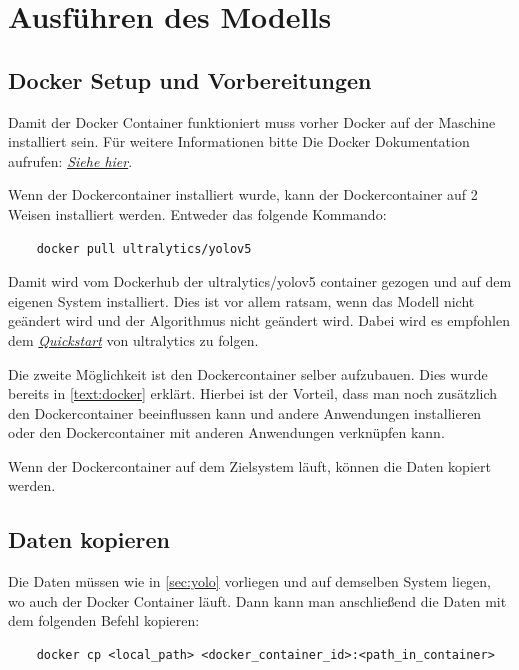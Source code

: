 \chapter{Ausführen des Modells}
\section{Docker Setup und Vorbereitungen}
Damit der Docker Container funktioniert muss vorher Docker auf der Maschine installiert sein. Für weitere Informationen bitte Die Docker Dokumentation aufrufen: \textit{\href{https://www.docker.com/get-started/}{Siehe hier}}.

Wenn der Dockercontainer installiert wurde, kann der Dockercontainer auf 2 Weisen installiert werden. Entweder das folgende Kommando:

\begin{verbatim}
    docker pull ultralytics/yolov5
\end{verbatim}

Damit wird vom Dockerhub der ultralytics/yolov5 container gezogen und auf dem eigenen System installiert. Dies ist vor allem ratsam, wenn das Modell nicht geändert wird und der Algorithmus nicht geändert wird. Dabei wird es empfohlen dem \textit{\href{https://github.com/ultralytics/yolov5/wiki/Docker-Quickstart}{Quickstart}} von ultralytics zu folgen.

Die zweite Möglichkeit ist den Dockercontainer selber aufzubauen. Dies wurde bereits in \autoref{text:docker} erklärt. Hierbei ist der Vorteil, dass man noch zusätzlich den Dockercontainer beeinflussen kann und andere Anwendungen installieren oder den Dockercontainer mit anderen Anwendungen verknüpfen kann.

Wenn der Dockercontainer auf dem Zielsystem läuft, können die Daten kopiert werden.

\section{Daten kopieren}

Die Daten müssen wie in \autoref{sec:yolo} vorliegen und auf demselben System liegen, wo auch der Docker Container läuft. Dann kann man anschließend die Daten mit dem folgenden Befehl kopieren:

\begin{verbatim}
    docker cp <local_path> <docker_container_id>:<path_in_container>
\end{verbatim}

